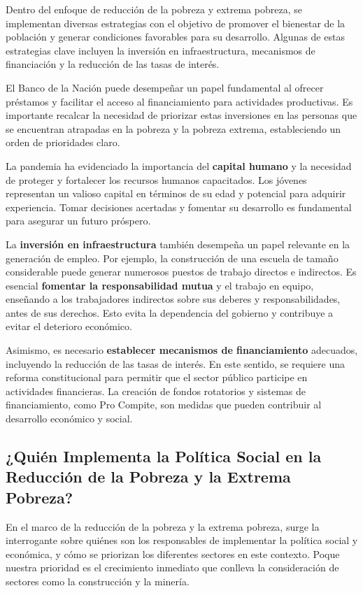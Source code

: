 \documentclass[
  jou,
  floatsintext,
  longtable,
  a4paper,
  nolmodern,
  notxfonts,
  notimes,
  12pt,
  colorlinks=true,linkcolor=blue,citecolor=blue,urlcolor=blue]{apa7}
\begin{document}
Dentro del enfoque de reducción de la pobreza y extrema pobreza, se
implementan diversas estrategias con el objetivo de promover el
bienestar de la población y generar condiciones favorables para su
desarrollo. Algunas de estas estrategias clave incluyen la inversión en
infraestructura, mecanismos de financiación y la reducción de las tasas
de interés.

El Banco de la Nación puede desempeñar un papel fundamental al ofrecer
préstamos y facilitar el acceso al financiamiento para actividades
productivas. Es importante recalcar la necesidad de priorizar estas
inversiones en las personas que se encuentran atrapadas en la pobreza y
la pobreza extrema, estableciendo un orden de prioridades claro.

La pandemia ha evidenciado la importancia del \textbf{capital humano} y
la necesidad de proteger y fortalecer los recursos humanos capacitados.
Los jóvenes representan un valioso capital en términos de su edad y
potencial para adquirir experiencia. Tomar decisiones acertadas y
fomentar su desarrollo es fundamental para asegurar un futuro próspero.

La \textbf{inversión en infraestructura} también desempeña un papel
relevante en la generación de empleo. Por ejemplo, la construcción de
una escuela de tamaño considerable puede generar numerosos puestos de
trabajo directos e indirectos. Es esencial \textbf{fomentar la
responsabilidad mutua} y el trabajo en equipo, enseñando a los
trabajadores indirectos sobre sus deberes y responsabilidades, antes de
sus derechos. Esto evita la dependencia del gobierno y contribuye a
evitar el deterioro económico.

Asimismo, es necesario \textbf{establecer mecanismos de financiamiento}
adecuados, incluyendo la reducción de las tasas de interés. En este
sentido, se requiere una reforma constitucional para permitir que el
sector público participe en actividades financieras. La creación de
fondos rotatorios y sistemas de financiamiento, como Pro Compite, son
medidas que pueden contribuir al desarrollo económico y social.

\subsection{¿Quién Implementa la Política Social en la Reducción de la
Pobreza y la Extrema
Pobreza?}\label{quiuxe9n-implementa-la-poluxedtica-social-en-la-reducciuxf3n-de-la-pobreza-y-la-extrema-pobreza}

En el marco de la reducción de la pobreza y la extrema pobreza, surge la
interrogante sobre quiénes son los responsables de implementar la
política social y económica, y cómo se priorizan los diferentes sectores
en este contexto. Poque nuestra prioridad es el crecimiento inmediato
que conlleva la consideración de sectores como la construcción y la
minería.
\end{document}
